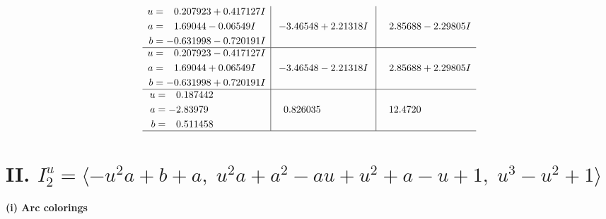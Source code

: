 \documentclass[1p]{elsarticle_modified}
\theoremstyle{definition}
\begin{document}
$$\begin{array}{c|c|c}
\begin{aligned}
u &= \phantom{-}0.207923 + 0.417127 I \\
a &= \phantom{-}1.69044 - 0.06549 I \\
b &= -0.631998 - 0.720191 I\end{aligned}
 & -3.46548 + 2.21318 I & \phantom{-}2.85688 - 2.29805 I \\ \hline\begin{aligned}
u &= \phantom{-}0.207923 - 0.417127 I \\
a &= \phantom{-}1.69044 + 0.06549 I \\
b &= -0.631998 + 0.720191 I\end{aligned}
 & -3.46548 - 2.21318 I & \phantom{-}2.85688 + 2.29805 I \\ \hline\begin{aligned}
u &= \phantom{-}0.187442\phantom{ +0.000000I} \\
a &= -2.83979\phantom{ +0.000000I} \\
b &= \phantom{-}0.511458\phantom{ +0.000000I}\end{aligned}
 & \phantom{-}0.826035\phantom{ +0.000000I} & \phantom{-}12.4720\phantom{ +0.000000I}\\
 \hline 
 \end{array}$$\newpage\newpage\renewcommand{\arraystretch}{1}
\centering \section*{II. $I^u_{2}= \langle - u^2 a+b+a,\;u^2 a+a^2- a u+u^2+a- u+1,\;u^3- u^2+1 \rangle$}
\flushleft \textbf{(i) Arc colorings}\\
\end{document}
